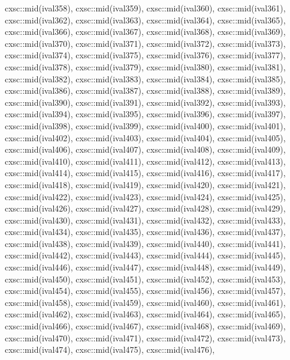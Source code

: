 \begin{DoxyCode}
{  cxsc::mid(ival358),
  cxsc::mid(ival359),
  cxsc::mid(ival360),
  cxsc::mid(ival361),
  cxsc::mid(ival362),
  cxsc::mid(ival363),
  cxsc::mid(ival364),
  cxsc::mid(ival365),
  cxsc::mid(ival366),
  cxsc::mid(ival367),
  cxsc::mid(ival368),
  cxsc::mid(ival369),
  cxsc::mid(ival370),
  cxsc::mid(ival371),
  cxsc::mid(ival372),
  cxsc::mid(ival373),
  cxsc::mid(ival374),
  cxsc::mid(ival375),
  cxsc::mid(ival376),
  cxsc::mid(ival377),
  cxsc::mid(ival378),
  cxsc::mid(ival379),
  cxsc::mid(ival380),
  cxsc::mid(ival381),
  cxsc::mid(ival382),
  cxsc::mid(ival383),
  cxsc::mid(ival384),
  cxsc::mid(ival385),
  cxsc::mid(ival386),
  cxsc::mid(ival387),
  cxsc::mid(ival388),
  cxsc::mid(ival389),
  cxsc::mid(ival390),
  cxsc::mid(ival391),
  cxsc::mid(ival392),
  cxsc::mid(ival393),
  cxsc::mid(ival394),
  cxsc::mid(ival395),
  cxsc::mid(ival396),
  cxsc::mid(ival397),
  cxsc::mid(ival398),
  cxsc::mid(ival399),
  cxsc::mid(ival400),
  cxsc::mid(ival401),
  cxsc::mid(ival402),
  cxsc::mid(ival403),
  cxsc::mid(ival404),
  cxsc::mid(ival405),
  cxsc::mid(ival406),
  cxsc::mid(ival407),
  cxsc::mid(ival408),
  cxsc::mid(ival409),
  cxsc::mid(ival410),
  cxsc::mid(ival411),
  cxsc::mid(ival412),
  cxsc::mid(ival413),
  cxsc::mid(ival414),
  cxsc::mid(ival415),
  cxsc::mid(ival416),
  cxsc::mid(ival417),
  cxsc::mid(ival418),
  cxsc::mid(ival419),
  cxsc::mid(ival420),
  cxsc::mid(ival421),
  cxsc::mid(ival422),
  cxsc::mid(ival423),
  cxsc::mid(ival424),
  cxsc::mid(ival425),
  cxsc::mid(ival426),
  cxsc::mid(ival427),
  cxsc::mid(ival428),
  cxsc::mid(ival429),
  cxsc::mid(ival430),
  cxsc::mid(ival431),
  cxsc::mid(ival432),
  cxsc::mid(ival433),
  cxsc::mid(ival434),
  cxsc::mid(ival435),
  cxsc::mid(ival436),
  cxsc::mid(ival437),
  cxsc::mid(ival438),
  cxsc::mid(ival439),
  cxsc::mid(ival440),
  cxsc::mid(ival441),
  cxsc::mid(ival442),
  cxsc::mid(ival443),
  cxsc::mid(ival444),
  cxsc::mid(ival445),
  cxsc::mid(ival446),
  cxsc::mid(ival447),
  cxsc::mid(ival448),
  cxsc::mid(ival449),
  cxsc::mid(ival450),
  cxsc::mid(ival451),
  cxsc::mid(ival452),
  cxsc::mid(ival453),
  cxsc::mid(ival454),
  cxsc::mid(ival455),
  cxsc::mid(ival456),
  cxsc::mid(ival457),
  cxsc::mid(ival458),
  cxsc::mid(ival459),
  cxsc::mid(ival460),
  cxsc::mid(ival461),
  cxsc::mid(ival462),
  cxsc::mid(ival463),
  cxsc::mid(ival464),
  cxsc::mid(ival465),
  cxsc::mid(ival466),
  cxsc::mid(ival467),
  cxsc::mid(ival468),
  cxsc::mid(ival469),
  cxsc::mid(ival470),
  cxsc::mid(ival471),
  cxsc::mid(ival472),
  cxsc::mid(ival473),
  cxsc::mid(ival474),
  cxsc::mid(ival475),
  cxsc::mid(ival476),
}
\end{DoxyCode}
